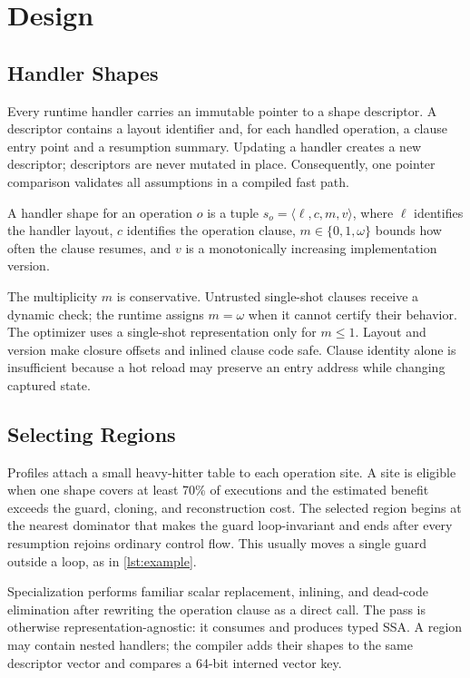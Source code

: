 \section{Design}
\label{sec:design}

\subsection{Handler Shapes}

Every runtime handler carries an immutable pointer to a shape descriptor. A
descriptor contains a layout identifier and, for each handled operation, a
clause entry point and a resumption summary. Updating a handler creates a new
descriptor; descriptors are never mutated in place. Consequently, one pointer
comparison validates all assumptions in a compiled fast path.

\begin{definition}
A handler shape for an operation $o$ is a tuple
$s_o=\langle \ell,c,m,v\rangle$, where $\ell$ identifies the handler layout,
$c$ identifies the operation clause, $m\in\{0,1,\omega\}$ bounds how often the
clause resumes, and $v$ is a monotonically increasing implementation version.
\end{definition}

The multiplicity $m$ is conservative. Untrusted single-shot clauses receive a
dynamic check; the runtime assigns $m=\omega$ when it cannot certify their
behavior. The optimizer uses a single-shot representation only for $m\leq1$.
Layout and version make closure offsets and inlined clause code safe. Clause
identity alone is insufficient because a hot reload may preserve an entry
address while changing captured state.

\subsection{Selecting Regions}

Profiles attach a small heavy-hitter table to each operation site. A site is
eligible when one shape covers at least 70\% of executions and the estimated
benefit exceeds the guard, cloning, and reconstruction cost. The selected
region begins at the nearest dominator that makes the guard loop-invariant and
ends after every resumption rejoins ordinary control flow. This usually moves a
single guard outside a loop, as in \cref{lst:example}.

Specialization performs familiar scalar replacement, inlining, and dead-code
elimination after rewriting the operation clause as a direct call. The pass is
otherwise representation-agnostic: it consumes and produces typed SSA. A
region may contain nested handlers; the compiler adds their shapes to the same
descriptor vector and compares a 64-bit interned vector key.


